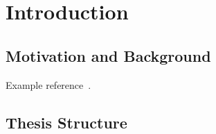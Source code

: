 \chapter{Introduction}
\section{Motivation and Background}
Example reference~\cite{AggarwalV88}.
\section{Thesis Structure}
\cite{Thornburg01}
